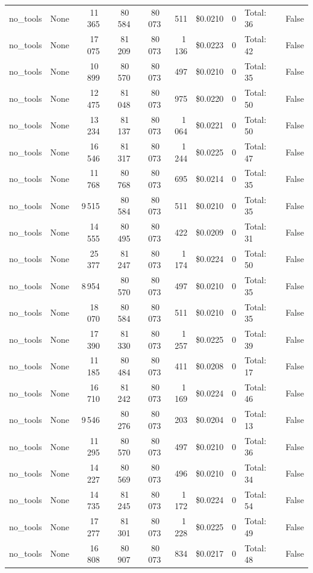 \documentclass[a4paper,11pt]{article}
\begin{document}
\begin{table}[H]
{\begin{tabular}{l r r r r r r r l r}
no\_tools & None & 11\,365 & 80\,584 & 80\,073 & 511 & \$0.0210 & 0 & Total: 36 & False \\
no\_tools & None & 17\,075 & 81\,209 & 80\,073 & 1\,136 & \$0.0223 & 0 & Total: 42 & False \\
no\_tools & None & 10\,899 & 80\,570 & 80\,073 & 497 & \$0.0210 & 0 & Total: 35 & False \\
no\_tools & None & 12\,475 & 81\,048 & 80\,073 & 975 & \$0.0220 & 0 & Total: 50 & False \\
no\_tools & None & 13\,234 & 81\,137 & 80\,073 & 1\,064 & \$0.0221 & 0 & Total: 50 & False \\
no\_tools & None & 16\,546 & 81\,317 & 80\,073 & 1\,244 & \$0.0225 & 0 & Total: 47 & False \\
no\_tools & None & 11\,768 & 80\,768 & 80\,073 & 695 & \$0.0214 & 0 & Total: 35 & False \\
no\_tools & None & 9\,515 & 80\,584 & 80\,073 & 511 & \$0.0210 & 0 & Total: 35 & False \\
no\_tools & None & 14\,555 & 80\,495 & 80\,073 & 422 & \$0.0209 & 0 & Total: 31 & False \\
no\_tools & None & 25\,377 & 81\,247 & 80\,073 & 1\,174 & \$0.0224 & 0 & Total: 50 & False \\
no\_tools & None & 8\,954 & 80\,570 & 80\,073 & 497 & \$0.0210 & 0 & Total: 35 & False \\
no\_tools & None & 18\,070 & 80\,584 & 80\,073 & 511 & \$0.0210 & 0 & Total: 35 & False \\
no\_tools & None & 17\,390 & 81\,330 & 80\,073 & 1\,257 & \$0.0225 & 0 & Total: 39 & False \\
no\_tools & None & 11\,185 & 80\,484 & 80\,073 & 411 & \$0.0208 & 0 & Total: 17 & False \\
no\_tools & None & 16\,710 & 81\,242 & 80\,073 & 1\,169 & \$0.0224 & 0 & Total: 46 & False \\
no\_tools & None & 9\,546 & 80\,276 & 80\,073 & 203 & \$0.0204 & 0 & Total: 13 & False \\
no\_tools & None & 11\,295 & 80\,570 & 80\,073 & 497 & \$0.0210 & 0 & Total: 36 & False \\
no\_tools & None & 14\,227 & 80\,569 & 80\,073 & 496 & \$0.0210 & 0 & Total: 34 & False \\
no\_tools & None & 14\,735 & 81\,245 & 80\,073 & 1\,172 & \$0.0224 & 0 & Total: 54 & False \\
no\_tools & None & 17\,277 & 81\,301 & 80\,073 & 1\,228 & \$0.0225 & 0 & Total: 49 & False \\
no\_tools & None & 16\,808 & 80\,907 & 80\,073 & 834 & \$0.0217 & 0 & Total: 48 & False \\
\bottomrule
\end{tabular}}
\end{table}
\end{document}
